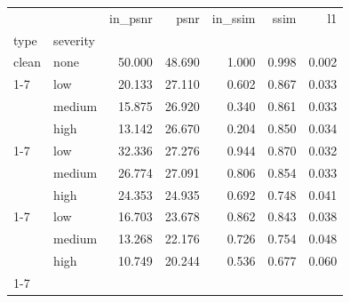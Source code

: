 \begin{tabular}{llrrrrr}
\toprule
 &  & in_psnr & psnr & in_ssim & ssim & l1 \\
type & severity &  &  &  &  &  \\
\midrule
clean & none & 50.000 & 48.690 & 1.000 & 0.998 & 0.002 \\
\cline{1-7}
\multirow[t]{3}{*}{salt_pepper} & low & 20.133 & 27.110 & 0.602 & 0.867 & 0.033 \\
 & medium & 15.875 & 26.920 & 0.340 & 0.861 & 0.033 \\
 & high & 13.142 & 26.670 & 0.204 & 0.850 & 0.034 \\
\cline{1-7}
\multirow[t]{3}{*}{blur} & low & 32.336 & 27.276 & 0.944 & 0.870 & 0.032 \\
 & medium & 26.774 & 27.091 & 0.806 & 0.854 & 0.033 \\
 & high & 24.353 & 24.935 & 0.692 & 0.748 & 0.041 \\
\cline{1-7}
\multirow[t]{3}{*}{occlusion} & low & 16.703 & 23.678 & 0.862 & 0.843 & 0.038 \\
 & medium & 13.268 & 22.176 & 0.726 & 0.754 & 0.048 \\
 & high & 10.749 & 20.244 & 0.536 & 0.677 & 0.060 \\
\cline{1-7}
\bottomrule
\end{tabular}
